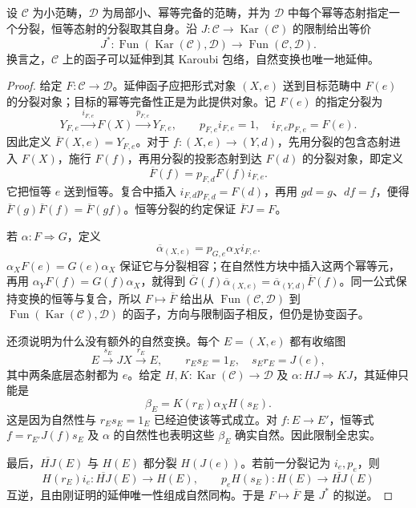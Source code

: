 \begin{theorem}\label{b4:thm:karoubi-universal-property}
	设 \(\mathcal C\) 为小范畴，\(\mathcal D\) 为局部小、幂等完备的范畴，并为 \(\mathcal D\) 中每个幂等态射指定一个分裂，恒等态射的分裂取其自身。沿 \(J:\mathcal C\to\operatorname{Kar}(\mathcal C)\) 的限制给出等价
	\[
		J^*:\operatorname{Fun}(\operatorname{Kar}(\mathcal C),\mathcal D) \longrightarrow\operatorname{Fun}(\mathcal C,\mathcal D).
	\]
	换言之，\(\mathcal C\) 上的函子可以延伸到其 Karoubi 包络，自然变换也唯一地延伸。
\end{theorem}
\begin{proof}
	给定 \(F:\mathcal C\to\mathcal D\)。延伸函子应把形式对象 \((X,e)\) 送到目标范畴中 \(F(e)\) 的分裂对象；目标的幂等完备性正是为此提供对象。记 \(F(e)\) 的指定分裂为
	\[
		Y_{F,e}\xrightarrow{i_{F,e}}F(X) \xrightarrow{p_{F,e}}Y_{F,e}, \qquad p_{F,e}i_{F,e}=1,\quad i_{F,e}p_{F,e}=F(e).
	\]
	因此定义 \(\overline F(X,e)=Y_{F,e}\)。对于 \(f:(X,e)\to(Y,d)\)，先用分裂的包含态射进入 \(F(X)\)，施行 \(F(f)\)，再用分裂的投影态射到达 \(F(d)\) 的分裂对象，即定义
	\[
		\overline F(f)=p_{F,d}F(f)i_{F,e}.
	\]
	它把恒等 \(e\) 送到恒等。复合中插入 \(i_{F,d}p_{F,d}=F(d)\)，再用 \(gd=g\)、\(df=f\)，便得 \(\overline F(g)\overline F(f)=\overline F(gf)\)。恒等分裂的约定保证 \(\overline FJ=F\)。

	若 \(\alpha:F\Rightarrow G\)，定义
	\[
		\overline\alpha_{(X,e)} =p_{G,e}\alpha_Xi_{F,e}.
	\]
	\(\alpha_XF(e)=G(e)\alpha_X\) 保证它与分裂相容；在自然性方块中插入这两个幂等元，再用 \(\alpha_YF(f)=G(f)\alpha_X\)，就得到 \(\overline G(f)\overline\alpha_{(X,e)}=\overline\alpha_{(Y,d)}\overline F(f)\)。同一公式保持变换的恒等与复合，所以 \(F\mapsto\overline F\) 给出从 \(\operatorname{Fun}(\mathcal C,\mathcal D)\) 到 \(\operatorname{Fun}(\operatorname{Kar}(\mathcal C),\mathcal D)\) 的函子，方向与限制函子相反，但仍是协变函子。

	还须说明为什么没有额外的自然变换。每个 \(E=(X,e)\) 都有收缩图
	\[
		E\xrightarrow{s_E}JX\xrightarrow{r_E}E, \qquad r_Es_E=1_E,\quad s_Er_E=J(e),
	\]
	其中两条底层态射都为 \(e\)。给定 \(H,K:\operatorname{Kar}(\mathcal C)\to\mathcal D\) 及 \(\alpha:HJ\Rightarrow KJ\)，其延伸只能是
	\[
		\beta_E=K(r_E)\alpha_XH(s_E).
	\]
	这是因为自然性与 \(r_Es_E=1_E\) 已经迫使该等式成立。对 \(f:E\to E'\)，恒等式 \(f=r_{E'}J(f)s_E\) 及 \(\alpha\) 的自然性也表明这些 \(\beta_E\) 确实自然。因此限制全忠实。

	最后，\(\overline{HJ}(E)\) 与 \(H(E)\) 都分裂 \(H(J(e))\)。若前一分裂记为 \(i_e,p_e\)，则
	\[
		H(r_E)i_e:\overline{HJ}(E)\to H(E), \qquad p_eH(s_E):H(E)\to\overline{HJ}(E)
	\]
	互逆，且由刚证明的延伸唯一性组成自然同构。于是 \(F\mapsto\overline F\) 是 \(J^*\) 的拟逆。
\end{proof}

